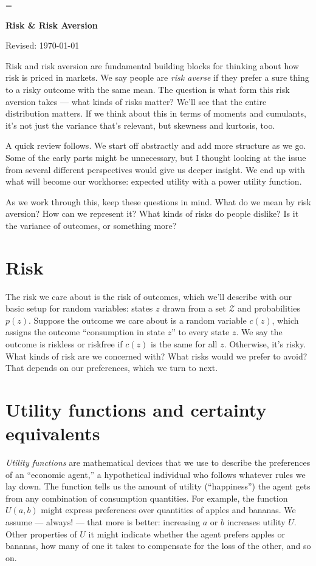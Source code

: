 \documentclass[11pt]{article}
\begin{document}
\parskip=\bigskipamount
\parindent=0.0in
\thispagestyle{empty}


\bigskip\bigskip
\centerline{\Large \bf Risk \& Risk Aversion}
\centerline{Revised: \today}

\medskip
Risk and risk aversion are fundamental building blocks
for thinking about how risk is priced in markets.
We say people are {\it risk averse\/} if they
prefer a sure thing to a risky outcome with the same mean.
The question is what form this risk aversion takes --- what kinds of risks matter?
We'll see that the entire distribution matters.
If we think about this in terms of moments and cumulants,
it's not just the variance that's relevant,
but skewness and kurtosis, too.

A quick review follows.
We start off abstractly and add more structure as we go.
Some of the early parts might be unnecessary,
but I thought looking at the issue from several different
perspectives would give us deeper insight.
We end up with what will become our workhorse:
expected utility with a power utility function.

As we work through this, keep these questions in mind.
What do we mean by risk aversion?
How can we represent it?
What kinds of risks do people dislike?
Is it the variance of outcomes, or something more?


\section{Risk}

The risk we care about is the risk of outcomes,
which we'll describe with our basic setup for random variables:
states $z$ drawn from a set $\mathcal{Z}$ and probabilities $p(z)$.
Suppose the outcome we care about is a random variable $c(z)$,
which assigns the outcome ``consumption in state $z$''
to every state $z$.
We say the outcome is riskless or riskfree if $c(z)$ is
the same for all $z$.
Otherwise, it's risky.
What kinds of risk are we concerned with?
What risks would we prefer to avoid?
That depends on our preferences, which we turn to next.


\section{Utility functions and certainty equivalents}

{\it Utility functions\/} are mathematical devices that we use
to describe the preferences of an ``economic agent,''
a hypothetical individual who follows whatever rules we lay down.
The function tells us the amount of utility (``happiness'')
the agent gets from any combination of consumption quantities.
For example, the function $U(a,b)$ might express preferences
over quantities of apples and bananas.
We assume --- always! --- that more is better:
increasing $a$ or $b$ increases utility $U$.
Other properties of $U$ it might indicate
whether the agent prefers apples or bananas,
how many of one it takes to compensate for the loss of the other,
and so on.
\end{document}
